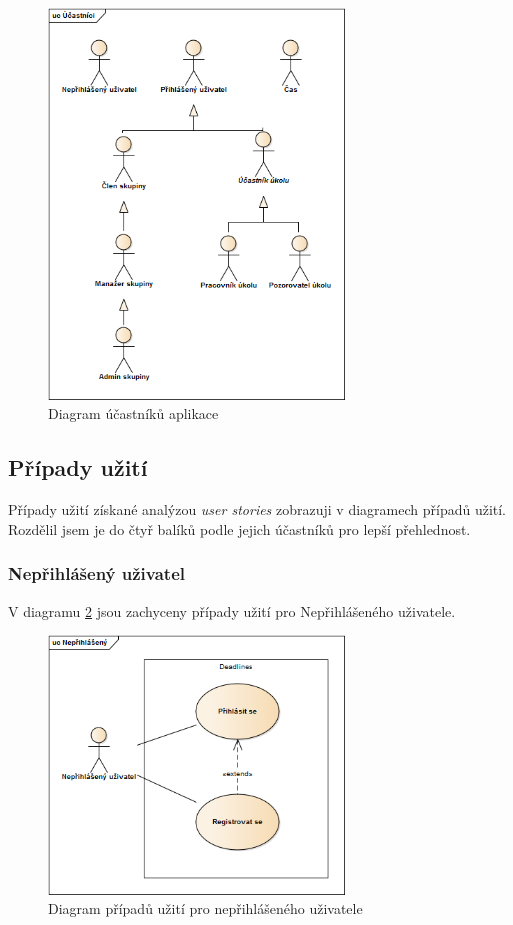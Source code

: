 \documentclass[thesis=B,czech]{FITthesis}[2012/06/26]
\begin{document}
			\begin{figure}\centering
				\includegraphics[width=0.7\textwidth]{ea-diagrams/uc-actors.png}
				\caption[Diagram účastníků]{Diagram účastníků aplikace}
				\label{diagram:actors}
			\end{figure}
			
			
			
		\subsection{Případy užití}
			\label{sec:usecases}
			Případy užití získané analýzou \textit{user stories} zobrazuji v diagramech případů užití. Rozdělil jsem je do čtyř balíků podle jejich účastníků pro lepší přehlednost.
			
			\subsubsection{Nepřihlášený uživatel}
			V diagramu \ref{diagram:uc-unauthorized} jsou zachyceny případy užití pro Nepřihlášeného uživatele.
			\begin{figure}\centering
				\includegraphics[width=0.7\textwidth]{ea-diagrams/uc-unauthorized.png}
				\caption[Případy užití nepřihlášených uživatelů]{Diagram případů užití pro nepřihlášeného uživatele}
				\label{diagram:uc-unauthorized}
			\end{figure}
			
\end{document}
